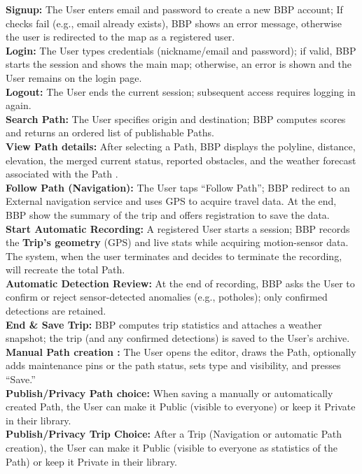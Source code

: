 \textbf{Signup:} The User enters email and password to create a new BBP account; If checks fail (e.g., email already exists), BBP shows an error message, otherwise the user is redirected to the map as a registered user.\\
\textbf{Login:} The User types credentials (nickname/email and password); if valid, BBP starts the session and shows the main map; otherwise, an error is shown and the User remains on the login page.\\
\textbf{Logout:} The User ends the current session; subsequent access requires logging in again.\\
\textbf{Search Path:} The User specifies origin and destination; BBP computes scores and returns an ordered list of publishable Paths.\\
\textbf{View Path details:} After selecting a Path, BBP displays the polyline, distance, elevation, the merged current status, reported obstacles, and the weather forecast associated with the Path .\\
\textbf{Follow Path (Navigation):} The User taps “Follow Path”; BBP redirect to an External navigation service and uses GPS to acquire travel data. At the end, BBP show the summary of the trip and offers registration to save the data.\\
\textbf{Start Automatic Recording:} A registered User starts a session; BBP records the \textbf{Trip's geometry} (GPS) and live stats while acquiring motion-sensor data. The system, when the user terminates and decides to terminate the recording, will recreate the total Path.\\
\textbf{Automatic Detection Review:} At the end of recording, BBP asks the User to confirm or reject sensor-detected anomalies (e.g., potholes); only confirmed detections are retained.\\
\textbf{End \& Save Trip:} BBP computes trip statistics and attaches a weather snapshot; the trip (and any confirmed detections) is saved to the User’s archive.\\
\textbf{Manual Path creation :} The User opens the editor, draws the Path, optionally adds maintenance pins or the path status, sets type and visibility, and presses “Save.”\\
\textbf{Publish/Privacy Path choice:} When saving a manually or automatically created Path, the User can make it Public (visible to everyone) or keep it Private in their library.\\
\textbf{Publish/Privacy Trip Choice:} After a Trip (Navigation or automatic Path creation), the User can make it Public (visible to everyone as statistics of the Path) or keep it Private in their library.\\
